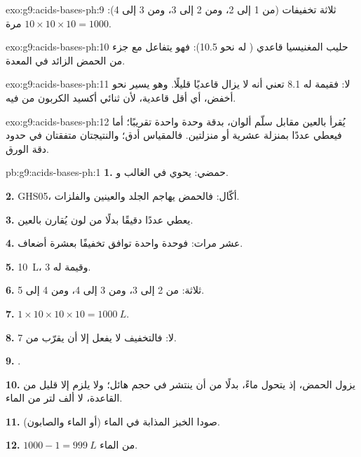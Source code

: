\begin{solution}{exo:g9:acids-bases-ph:9}
ثلاثة تخفيفات (من 1 إلى 2، ومن 2 إلى 3، ومن 3 إلى 4): $10 \times 10 \times 10 =
1000$ مرة.
\end{solution}

\begin{solution}{exo:g9:acids-bases-ph:10}
حليب المغنيسيا قاعدي ( له نحو 10.5): فهو يتفاعل مع جزء من الحمض الزائد
في المعدة.
\end{solution}

\begin{solution}{exo:g9:acids-bases-ph:11}
لا: فقيمة  له 8.1 تعني أنه لا يزال قاعديًا قليلًا. وهو يسير نحو  أخفض،
أي أقل قاعدية، لأن ثنائي أكسيد الكربون من  
فيه.
\end{solution}

\begin{solution}{exo:g9:acids-bases-ph:12}
 يُقرأ بالعين مقابل سلّم ألوان، بدقة وحدة واحدة تقريبًا؛ أما 
فيعطي عددًا بمنزلة عشرية أو منزلتين. فالمقياس أدق؛ والنتيجتان متفقتان في
حدود دقة الورق.
\end{solution}

\begin{solution}{pb:g9:acids-bases-ph:1}
\textbf{1.} حمضي: يحوي في الغالب   و.

\textbf{2.} GHS05، أكّال: فالحمض يهاجم الجلد والعينين والفلزات.

\textbf{3.} يعطي عددًا دقيقًا بدلًا من لون يُقارن
بالعين.

\textbf{4.} عشر مرات: فوحدة  واحدة توافق تخفيفًا بعشرة أضعاف.

\textbf{5.} \qty{10}{L}، وقيمة  له 3.

\textbf{6.} ثلاثة: من  2 إلى 3، ومن 3 إلى 4، ومن 4 إلى 5.

\textbf{7.} $1 \times 10 \times 10 \times 10 = \qty{1000}{L}$.

\textbf{8.} لا: فالتخفيف لا يفعل إلا أن يقرّب  من 7.

\textbf{9.} .

\textbf{10.} يزول الحمض، إذ يتحول ماءً، بدلًا من أن ينتشر في حجم هائل؛ ولا
يلزم إلا قليل من القاعدة، لا ألف لتر من الماء.

\textbf{11.} صودا الخبز المذابة في الماء (أو الماء والصابون).

\textbf{12.} $1000 - 1 = \qty{999}{L}$ من الماء.
\end{solution}
